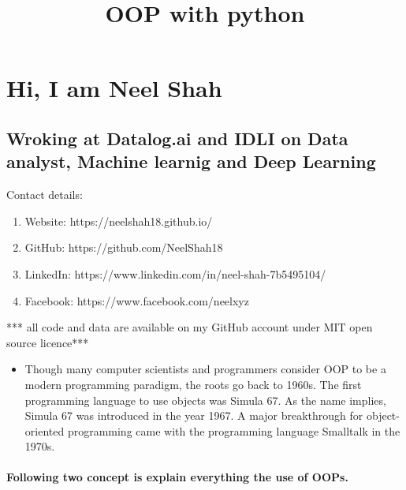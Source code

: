 \documentclass[11pt]{article}
\title{OOP with python}
\providecommand{\tightlist}{%
      \setlength{\itemsep}{0pt}\setlength{\parskip}{0pt}}
\begin{document}
    
    
    \maketitle
    
    

    
    \section{Hi, I am Neel Shah}\label{hi-i-am-neel-shah}

\subsection{Wroking at Datalog.ai and IDLI on Data analyst, Machine
learnig and Deep
Learning}\label{wroking-at-datalog.ai-and-idli-on-data-analyst-machine-learnig-and-deep-learning}

Contact details:

\begin{enumerate}
\def\labelenumi{\arabic{enumi})}
\item
  Website: https://neelshah18.github.io/
\item
  GitHub: https://github.com/NeelShah18
\item
  LinkedIn: https://www.linkedin.com/in/neel-shah-7b5495104/
\item
  Facebook: https://www.facebook.com/neelxyz
\end{enumerate}

*** all code and data are available on my GitHub account under MIT open
source licence***

    \begin{itemize}
\tightlist
\item
  Though many computer scientists and programmers consider OOP to be a
  modern programming paradigm, the roots go back to 1960s. The first
  programming language to use objects was Simula 67. As the name
  implies, Simula 67 was introduced in the year 1967. A major
  breakthrough for object-oriented programming came with the programming
  language Smalltalk in the 1970s.
\end{itemize}

\paragraph{Following two concept is explain everything the use of
OOPs.}\label{following-two-concept-is-explain-everything-the-use-of-oops.}
\end{document}
